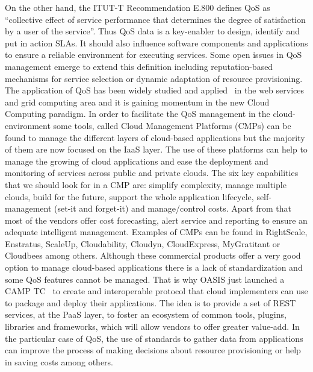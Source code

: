 On the other hand, the ITUT-T Recommendation E.800 defines QoS as ``collective effect of service performance that determines the degree of satisfaction by a user of the service''. 
Thus QoS data is a key-enabler to design, identify and put in action SLAs. It should also influence software components and applications to ensure a 
reliable environment for executing services. Some open issues in QoS management emerge to extend this definition including reputation-based mechanisms 
for service selection or dynamic adaptation of resource provisioning. The application of QoS has been widely studied and applied~\cite{Conejero:2012:MSQ:2357487.2357591,Pedersen:2011:AMQ:2114495.2115542} 
in the web services and grid computing area and it is gaining momentum in the new Cloud Computing paradigm. In order to facilitate the QoS management in the cloud-environment 
some tools, called Cloud Management Platforms (CMPs) can be found to manage the different layers of cloud-based applications but the majority of them are 
now focused on the IaaS layer. The use of these platforms can help to manage the growing of cloud applications and ease the deployment and monitoring of services across 
public and private clouds. The six key capabilities~\cite{Kephart2012} that we should look for in a CMP are: simplify complexity, 
manage multiple clouds, build for the future, support the whole application lifecycle, self-management (set-it and forget-it) and manage/control costs. 
Apart from that most of the vendors offer cost forecasting, alert service and reporting to ensure an adequate intelligent management. 
Examples of CMPs can be found in RightScale, Enstratus, ScaleUp, Cloudability, Cloudyn, CloudExpress, MyGratitant or Cloudbees among others. 
Although these commercial products offer a very good option to manage cloud-based applications there is a lack of standardization and some 
QoS features cannot be managed. That is why OASIS just launched a CAMP TC~\cite{OASISCamp} to create and interoperable protocol that cloud 
implementers can use to package and deploy their applications. The idea is to provide a set of REST services, at the PaaS layer, to foster an ecosystem of 
common tools, plugins, libraries and frameworks, which will allow vendors to offer greater value-add. In the particular case of QoS, the use of standards to gather data 
from applications can improve the process of making decisions about resource provisioning or help in saving costs among others.

